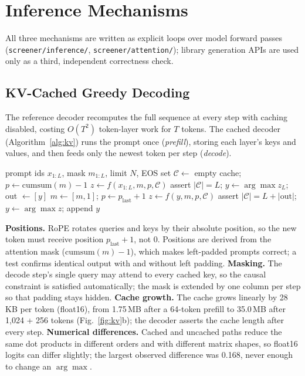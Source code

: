 \documentclass[conference]{IEEEtran}
\newcommand{\code}[1]{\texttt{\small #1}}
\begin{document}
\section{Inference Mechanisms}\label{sec:inference}
All three mechanisms are written as explicit loops over model forward passes (\code{screener/inference/}, \code{screener/attention/}); library generation APIs are used only as a third, independent correctness check.

\subsection{KV-Cached Greedy Decoding}
The reference decoder recomputes the full sequence at every step with caching disabled, costing $O(T^2)$ token-layer work for $T$ tokens. The cached decoder (Algorithm~\ref{alg:kv}) runs the prompt once (\emph{prefill}), storing each layer's keys and values, and then feeds only the newest token per step (\emph{decode}).

\begin{algorithm}[t]
\caption{Explicit KV-cached greedy decoding}\label{alg:kv}
\begin{algorithmic}[1]
\Require prompt ids $x_{1:L}$, mask $m_{1:L}$, limit $N$, EOS set
\State $\mathcal{C}\gets$ empty cache; $p\gets \mathrm{cumsum}(m)-1$ 
\State $z\gets f(x_{1:L}, m, p, \mathcal{C})$ 
\State assert $|\mathcal{C}|=L$; $y\gets\arg\max z_L$; out $\gets[y]$
  \State $m\gets[m,1]$; $p\gets p_{\text{last}}+1$
  \State $z\gets f(y, m, p, \mathcal{C})$ 
  \State assert $|\mathcal{C}|=L+|\text{out}|$; $y\gets\arg\max z$; append $y$
\EndWhile
\end{algorithmic}
\end{algorithm}

\textbf{Positions.} RoPE rotates queries and keys by their absolute position, so the new token must receive position $p_{\text{last}}+1$, not 0. Positions are derived from the attention mask ($\mathrm{cumsum}(m)-1$), which makes left-padded prompts correct; a test confirms identical output with and without left padding. \textbf{Masking.} The decode step's single query may attend to every cached key, so the causal constraint is satisfied automatically; the mask is extended by one column per step so that padding stays hidden. \textbf{Cache growth.} The cache grows linearly by 28\,KB per token (float16), from 1.75\,MB after a 64-token prefill to 35.0\,MB after 1{,}024 + 256 tokens (Fig.~\ref{fig:kv}b); the decoder asserts the cache length after every step. \textbf{Numerical differences.} Cached and uncached paths reduce the same dot products in different orders and with different matrix shapes, so float16 logits can differ slightly; the largest observed difference was 0.168, never enough to change an $\arg\max$.
\end{document}
